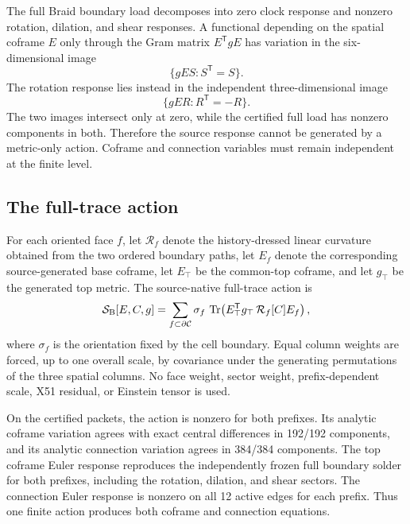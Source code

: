 The full Braid boundary load decomposes into zero clock response and nonzero rotation, dilation, and shear responses. A functional depending on the spatial coframe $E$ only through the Gram matrix $E^{\mathsf T}gE$ has variation in the six-dimensional image
\begin{equation}\label{eq:metricimage}
 \{gES:S^{\mathsf T}=S\}.
\end{equation}
The rotation response lies instead in the independent three-dimensional image
\begin{equation}\label{eq:rotationimage}
 \{gER:R^{\mathsf T}=-R\}.
\end{equation}
The two images intersect only at zero, while the certified full load has nonzero components in both. Therefore the source response cannot be generated by a metric-only action. Coframe and connection variables must remain independent at the finite level.

\subsection{The full-trace action}

For each oriented face $f$, let $\mathcal R_f$ denote the history-dressed linear curvature obtained from the two ordered boundary paths, let $E_f$ denote the corresponding source-generated base coframe, let $E_\top$ be the common-top coframe, and let $g_\top$ be the generated top metric. The source-native full-trace action is
\begin{equation}\label{eq:fullaction}
 \mathcal S_{\mathrm{B}}[E,C,g]
 =\sum_{f\subset\partial\mathcal C}
 \sigma_f\,\operatorname{Tr}\!\left(E_\top^{\mathsf T}g_\top\,\mathcal R_f[C]E_f\right),
\end{equation}
where $\sigma_f$ is the orientation fixed by the cell boundary. Equal column weights are forced, up to one overall scale, by covariance under the generating permutations of the three spatial columns. No face weight, sector weight, prefix-dependent scale, X51 residual, or Einstein tensor is used.

On the certified packets, the action is nonzero for both prefixes. Its analytic coframe variation agrees with exact central differences in 192/192 components, and its analytic connection variation agrees in 384/384 components. The top coframe Euler response reproduces the independently frozen full boundary solder for both prefixes, including the rotation, dilation, and shear sectors. The connection Euler response is nonzero on all 12 active edges for each prefix. Thus one finite action produces both coframe and connection equations.

